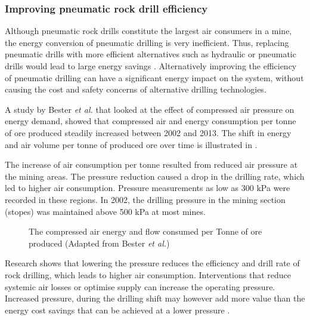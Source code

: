 		\subsubsection{Improving pneumatic rock drill efficiency}
		 Although pneumatic rock drills constitute the largest air consumers in a mine, the energy conversion of pneumatic drilling is very inefficient. Thus, replacing pneumatic drills with more efficient alternatives such as hydraulic or pneumatic drills would lead to large energy savings \cite{Pascoe2016Masters}. Alternatively improving the efficiency of pneumatic drilling can have a significant energy impact on the system, without causing the cost and safety concerns of alternative drilling technologies.
		 \par 
		 A study by Bester \textit{et al.} \cite{bester2013effect} that looked at the effect of compressed air pressure on energy demand, showed that compressed air and energy consumption per tonne of ore produced steadily increased between 2002 and 2013. The shift in energy and air volume per tonne of produced ore over time is illustrated in . 
		 \par
		 The increase of air consumption per tonne resulted from reduced air pressure at the mining areas. The pressure reduction caused a drop in the drilling rate, which led to higher air consumption. Pressure measurements as low as 300 kPa were recorded in these regions. In 2002, the drilling pressure in the mining section (stopes) was maintained above 500 kPa at most mines\footnotemark[1]. 
		 \par 
		 \begin{figure}[!htbp]
		 	\centering
		 	
		 	\caption[The compressed air energy and flow consumed per Tonne of ore produced]{The compressed air energy and flow consumed per Tonne of ore produced (Adapted from Bester \textit{et al.}\cite{bester2013effect})}
		 	\label{fig: Compressed energy and deep level per ton}
		 \end{figure}
	 \clearpage
		 Research shows that lowering the pressure reduces the efficiency and drill rate of rock drilling, which leads to higher air consumption. Interventions that reduce systemic air losses or optimise supply can increase the operating pressure. Increased pressure, during the drilling shift may however add more value than the energy cost savings that can be achieved at a lower pressure \cite{bester2013effect}.
